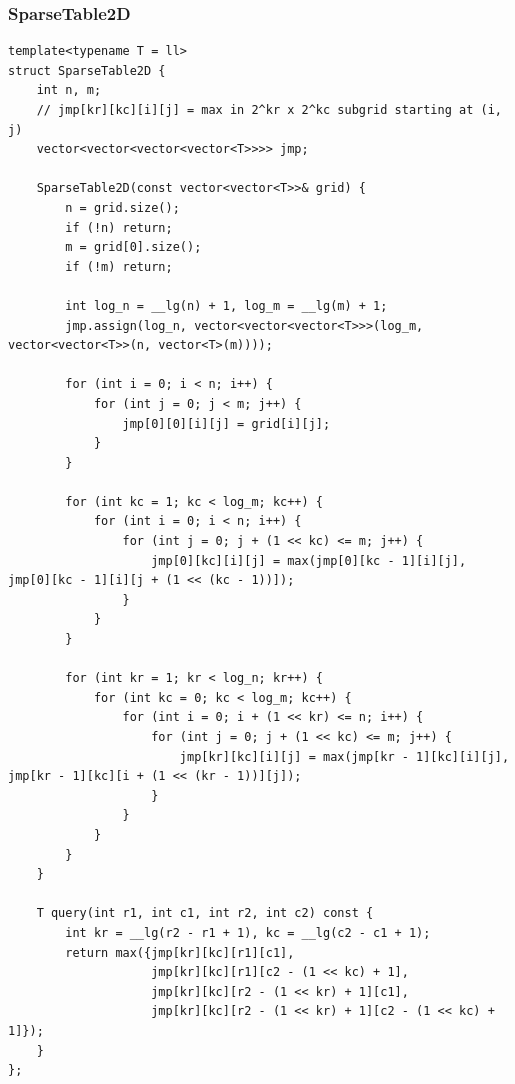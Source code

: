 \documentclass[9pt,a4paper,twocolumn]{extarticle}
\begin{document}
\filbreak
\subsubsection{SparseTable2D}
\nopagebreak
\begin{lstlisting}
template<typename T = ll>
struct SparseTable2D {
    int n, m;
    // jmp[kr][kc][i][j] = max in 2^kr x 2^kc subgrid starting at (i, j)
    vector<vector<vector<vector<T>>>> jmp;

    SparseTable2D(const vector<vector<T>>& grid) {
        n = grid.size();
        if (!n) return;
        m = grid[0].size();
        if (!m) return;

        int log_n = __lg(n) + 1, log_m = __lg(m) + 1;
        jmp.assign(log_n, vector<vector<vector<T>>>(log_m, vector<vector<T>>(n, vector<T>(m))));

        for (int i = 0; i < n; i++) {
            for (int j = 0; j < m; j++) {
                jmp[0][0][i][j] = grid[i][j];
            }
        }

        for (int kc = 1; kc < log_m; kc++) {
            for (int i = 0; i < n; i++) {
                for (int j = 0; j + (1 << kc) <= m; j++) {
                    jmp[0][kc][i][j] = max(jmp[0][kc - 1][i][j], jmp[0][kc - 1][i][j + (1 << (kc - 1))]);
                }
            }
        }

        for (int kr = 1; kr < log_n; kr++) {
            for (int kc = 0; kc < log_m; kc++) {
                for (int i = 0; i + (1 << kr) <= n; i++) {
                    for (int j = 0; j + (1 << kc) <= m; j++) {
                        jmp[kr][kc][i][j] = max(jmp[kr - 1][kc][i][j], jmp[kr - 1][kc][i + (1 << (kr - 1))][j]);
                    }
                }
            }
        }
    }

    T query(int r1, int c1, int r2, int c2) const {
        int kr = __lg(r2 - r1 + 1), kc = __lg(c2 - c1 + 1);
        return max({jmp[kr][kc][r1][c1],
                    jmp[kr][kc][r1][c2 - (1 << kc) + 1],
                    jmp[kr][kc][r2 - (1 << kr) + 1][c1],
                    jmp[kr][kc][r2 - (1 << kr) + 1][c2 - (1 << kc) + 1]});
    }
};
\end{lstlisting}

\filbreak
\end{document}
